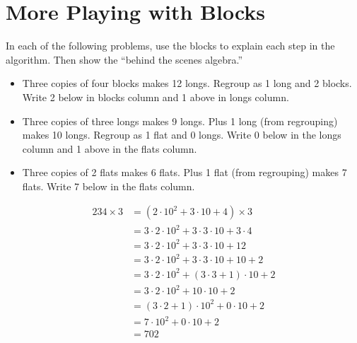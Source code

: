 \newpage
\section{More Playing with Blocks}\label{A:B2} 

\begin{teachingnote}
In each of the following problems, use the blocks to explain each step in the algorithm.  Then show the ``behind the scenes algebra.''


\begin{itemize}
\item Three copies of four blocks makes 12 longs.  Regroup as 1 long and 2 blocks. Write 2 below in blocks column and 1 above in longs column.
\item Three copies of three longs makes 9 longs.  Plus 1 long (from regrouping) makes 10 longs.  Regroup as 1 flat and 0 longs.  Write 0 below in the longs column and 1 above in the flats column.  
\item Three copies of 2 flats makes 6 flats.  Plus 1 flat (from regrouping) makes 7 flats.  Write 7 below in the flats column.  
\end{itemize}

\begin{align*}
234 \times 3 & = (2\cdot 10^2 + 3\cdot 10 + 4)\times 3 \\
&= 3\cdot 2\cdot 10^2 + 3\cdot 3\cdot 10 + 3\cdot 4 \\
&= 3\cdot 2\cdot 10^2 + 3\cdot 3\cdot 10 + 12 \\
&= 3\cdot 2\cdot 10^2 + 3\cdot 3\cdot 10 + 10 + 2\\
&= 3\cdot 2\cdot 10^2 + (3\cdot 3 + 1)\cdot 10 + 2\\
&= 3\cdot 2\cdot 10^2 + 10 \cdot 10 + 2\\
&= (3\cdot 2 + 1) \cdot 10^2 + 0 \cdot 10 + 2\\
&= 7\cdot 10^2 + 0 \cdot 10 + 2\\
&=702
\end{align*}

\end{teachingnote}




